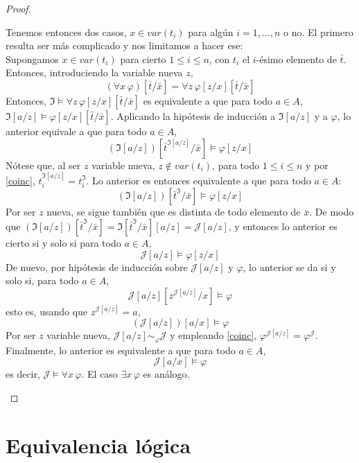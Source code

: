 \begin{proof}
\begin{enumerate}
\begin{itemize}
\begin{itemize}
    Tenemos entonces dos casos, $x \in var(t_i)$ para algún $i=1,\dots,n$ o no. El primero resulta ser más complicado y nos limitamos a hacer ese:\\
    Supongamos $x \in var(t_i)$ para cierto $1 \leq i \leq n$, con $t_i$ el $i$-ésimo elemento de $\bar{t}$. Entonces, introduciendo la variable nueva $z$, 
    $$(\forall x \, \varphi)[\bar{t}/\bar{x}] = \forall z \, \varphi[z/x][\bar{t}/\bar{x}]$$
    Entonces, $\mathfrak{I} \vDash \forall z \, \varphi[z/x][\bar{t}/\bar{x}]$ es equivalente a que para todo $a \in A$, $\mathfrak{I}[a/z] \vDash \varphi[z/x][\bar{t}/\bar{x}]$. Aplicando la hipótesis de inducción a $\mathfrak{I}[a/z]$ y a $\varphi$, lo anterior equivale a que para todo $a \in A$,
    $$(\mathfrak{I}[a/z])[\bar{t}^{\mathfrak{I}[a/z]}/\bar{x}] \vDash \varphi[z/x]$$
    Nótese que, al ser $z$ variable nueva, $z \notin var(t_i)$, para todo $1 \leq i \leq n$ y por \ref{coinc}, $t_i^{\mathfrak{I}[a/z]} = t_i^{\mathfrak{I}}$. Lo anterior es entonces equivalente a que para todo $a \in A$:
    $$(\mathfrak{I}[a/z])[\bar{t}^{\mathfrak{I}}/\bar{x}] \vDash \varphi[z/x]$$
    Por ser $z$ nueva, se sigue también que es distinta de todo elemento de $\bar{x}$. De modo que
    $(\mathfrak{I}[a/z])[\bar{t}^{\mathfrak{I}}/\bar{x}] = \mathfrak{I}[\bar{t}^{\mathfrak{I}}/\bar{x}][a/z] = \mathcal{J}[a/z]$, y entonces lo anterior es cierto si y solo si para todo $a \in A$, 
    $$\mathcal{J}[a/z] \vDash \varphi[z/x]$$
    De nuevo, por hipótesis de inducción sobre $\mathcal{J}[a/z]$ y $\varphi$, lo anterior se da si y solo si, para todo $a \in A$,
    $$\mathcal{J}[a/z][z^{\mathcal{J}[a/z]}/x] \vDash \varphi$$
    esto es, usando que $z^{\mathcal{J}[a/z]} = a$, 
    $$(\mathcal{J}[a/z])[a/x] \vDash \varphi$$
    Por ser $z$ variable nueva, $\mathcal{J}[a/z] \sim_{\varphi} \mathcal{J}$ y empleando \ref{coinc}, $\varphi^{\mathcal{J}[a/z]} = \varphi^{\mathcal{J}}$. Finalmente, lo anterior es equivalente a que para todo $a \in A$,
    $$\mathcal{J}[a/x] \vDash \varphi$$
    es decir, $\mathcal{J} \vDash \forall x \, \varphi$.
    El caso $\exists x \, \varphi$ es análogo.
                    \end{itemize}
        \end{itemize}
    
\end{enumerate}
\end{proof}


\section{Equivalencia lógica}


